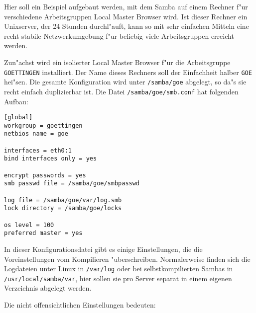 \documentclass{scrartcl}\usepackage{pslatex}\typearea{12}
\newcommand{\dateistyle}{\texttt}
\newcommand{\nbname}{\texttt}
\begin{document}
Hier soll ein Beispiel aufgebaut werden, mit dem Samba auf einem
Rechner f"ur verschiedene Arbeitsgruppen Local Master Browser
wird. Ist dieser Rechner ein Unixserver, der 24 Stunden durchl"auft,
kann so mit sehr einfachen Mitteln eine recht stabile Netzwerkumgebung
f"ur beliebig viele Arbeitsgruppen erreicht werden.

Zun"achst wird ein isolierter Local Master Browser f"ur die
Arbeitsgruppe \nbname{GOETTINGEN} installiert. Der Name dieses
Rechners soll der Einfachheit halber \nbname{GOE} hei"sen. Die gesamte
Konfiguration wird unter \dateistyle{/samba/goe} abgelegt, so da"s sie
recht einfach duplizierbar ist. Die Datei
\dateistyle{/samba/goe/smb.conf} hat folgenden Aufbau:

\begin{verbatim}
[global]
workgroup = goettingen
netbios name = goe

interfaces = eth0:1
bind interfaces only = yes

encrypt passwords = yes 
smb passwd file = /samba/goe/smbpasswd

log file = /samba/goe/var/log.smb
lock directory = /samba/goe/locks

os level = 100
preferred master = yes
\end{verbatim}
\label{smbconf-goe}

In dieser Konfigurationsdatei gibt es einige Einstellungen, die die
Voreinstellungen vom Kompilieren "uberschreiben. Normalerweise finden
sich die Logdateien unter Linux in \dateistyle{/var/log} oder bei
selbstkompilierten Sambas in \dateistyle{/usr/local/samba/var}, hier
sollen sie pro Server separat in einem eigenen Verzeichnis abgelegt
werden.

Die nicht offensichtlichen Einstellungen bedeuten:
\end{document}
